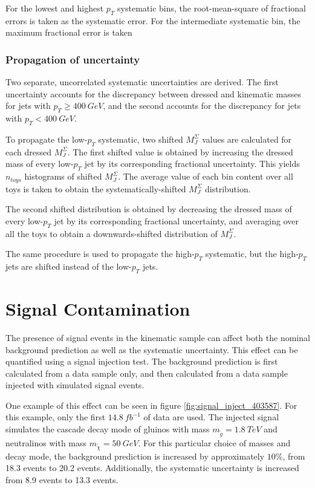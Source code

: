 For the lowest and highest $p_T$ systematic bins, the root-mean-square
of fractional errors is taken as the systematic error. For the
intermediate systematic bin, the maximum fractional error is taken

\subsubsection{Propagation of uncertainty}
Two separate, uncorrelated systematic uncertainties are derived. The first
uncertainty accounts for the discrepancy between dressed and kinematic
masses for jets with $p_T \geq 400~GeV$, and the second accounts for the
discrepancy for jets with $p_T < 400~GeV$.

To propagate the low-$p_T$ systematic, two shifted $M_{J}^{\Sigma}$
values are calculated for each dressed $M_{J}^{\Sigma}$. The first
shifted value is obtained by increasing the dressed mass of every
low-$p_T$ jet by its corresponding fractional uncertainty. This yields
$n_{toys}$ histograms of shifted $M_{J}^{\Sigma}$. The average value
of each bin content over all toys is taken to obtain the
systematically-shifted $M_{J}^{\Sigma}$ distribution. 

The second
shifted distribution is obtained by decreasing the dressed mass of every
low-$p_T$ jet by its corresponding fractional uncertainty, and
averaging over all the toys to obtain a downwards-shifted distribution
of $M_{J}^{\Sigma}$. 

The same procedure is used to propagate the high-$p_T$ systematic, but
the high-$p_T$ jets are shifted instead of the low-$p_T$ jets.

\section{Signal Contamination}
The presence of signal events in the kinematic sample can affect both
the nominal background prediction as well as the systematic
uncertainty. This effect can be quantified using a signal injection
test. The background prediction is first calculated from a data sample
only, and then calculated from a data sample injected with simulated
signal events.

One example of this
effect can be seen in figure \ref{fig:signal_inject_403587}. For this
example, only the first $14.8~fb^{-1}$ of data are used. The injected
signal simulates the cascade decay mode of gluinos with mass
$m_{\tilde{g}}=1.8~TeV$ and neutralinos with mass
$m_{\tilde{\chi}}=50~GeV$. For this particular choice of masses and
decay mode, the background prediction is increased by approximately
$10\%$, from 18.3 events to 20.2 events. Additionally, the systematic
uncertainty is increased from 8.9 events to 13.3 events.

